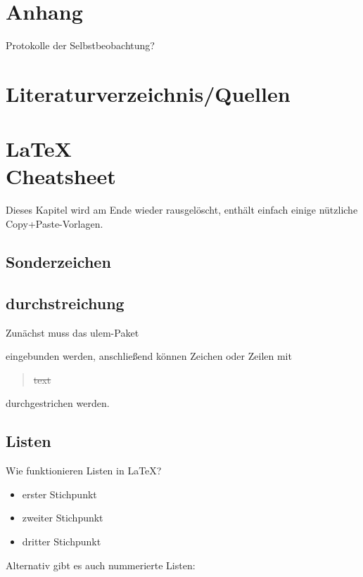 \documentclass[11pt,a4paper,twoside]{scrreprt}
\begin{document}
\chapter{Anhang}
Protokolle der Selbstbeobachtung? 

\fi
\chapter{Literaturverzeichnis/Quellen}
\printbibliography

\iffalse

\chapter{\LaTeX{}\\Cheatsheet}
Dieses Kapitel wird am Ende wieder rausgelöscht, enthält einfach einige nützliche Copy+Paste-Vorlagen.
\section{Sonderzeichen}
\textcopyright
\textregistered
\texttrademark

\section{durchstreichung}
Zunächst muss das ulem-Paket \begin{code}\usepackage{ulem}\end{code} eingebunden werden, anschließend können Zeichen oder Zeilen mit \begin{quotation}\sout{text}\end{quotation} durchgestrichen werden.


\section{Listen}

Wie funktionieren Listen in \LaTeX{}?\\

\begin{itemize}
\item erster Stichpunkt 
\item zweiter Stichpunkt
\item dritter Stichpunkt
\end{itemize}

Alternativ gibt es auch nummerierte Listen:
\end{document}
